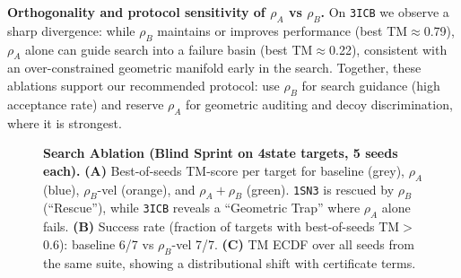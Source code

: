 \textbf{Orthogonality and protocol sensitivity of $\rho_A$ vs $\rho_B$.}
On \texttt{3ICB} we observe a sharp divergence: while $\rho_B$ maintains or improves performance (best TM$\approx$0.79), $\rho_A$ alone can guide search into a failure basin (best TM$\approx$0.22), consistent with an over-constrained geometric manifold early in the search. Together, these ablations support our recommended protocol: use $\rho_B$ for search guidance (high acceptance rate) and reserve $\rho_A$ for geometric auditing and decoy discrimination, where it is strongest.

\begin{figure}[t]
  \centering
  \caption{\textbf{Search Ablation (Blind Sprint on 4state targets, 5 seeds each).}
  \textbf{(A)} Best-of-seeds TM-score per target for baseline (grey), $\rho_A$ (blue), $\rho_B$-vel (orange), and $\rho_A+\rho_B$ (green). \texttt{1SN3} is rescued by $\rho_B$ (``Rescue''), while \texttt{3ICB} reveals a ``Geometric Trap'' where $\rho_A$ alone fails.
  \textbf{(B)} Success rate (fraction of targets with best-of-seeds TM$>$0.6): baseline 6/7 vs $\rho_B$-vel 7/7.
  \textbf{(C)} TM ECDF over all seeds from the same suite, showing a distributional shift with certificate terms.
  }
  \label{fig:blind_sprint_ablation}
\end{figure}

\begin{table}[t]
  \centering
  \caption{Full1k hybrid protocol (triple232; $m=8$): effect sizes vs strong nulls. Cliff's $\delta<0$ indicates the real chain is more ordered (lower metric) than the null. Percentiles are native percentiles among shuffle replicates.}
  \label{tab:auric_full1k}
  {%
    \setlength{\tabcolsep}{4pt}%
    \renewcommand{\arraystretch}{1.08}%
    \small%
  }%
\end{table}

